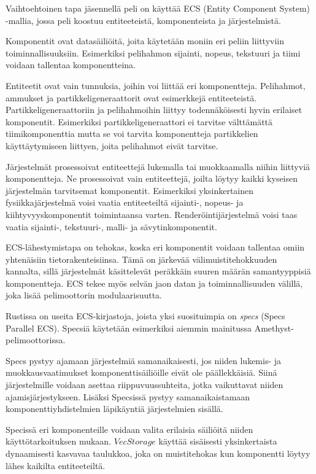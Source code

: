 \documentclass[finnish]{tktltiki2}
\theoremstyle{definition}
\theoremstyle{remark}
\begin{document}
Vaihtoehtoinen tapa jäsennellä peli on käyttää ECS (Entity Component System) -mallia, jossa peli koostuu entiteeteistä, komponenteista ja järjestelmistä.

Komponentit ovat datasäiliöitä, joita käytetään moniin eri peliin liittyviin toiminnallisuuksiin. Esimerkiksi pelihahmon sijainti, nopeus, tekstuuri ja tiimi voidaan tallentaa komponentteina.

Entiteetit ovat vain tunnuksia, joihin voi liittää eri komponentteja. Pelihahmot, ammukset ja partikkeligeneraattorit ovat esimerkkejä entiteeteistä. Partikkeligeneraattoriin ja pelihahmoihin liittyy todennäköisesti hyvin erilaiset komponentit. Esimerkiksi partikkeligeneraattori ei tarvitse välttämättä tiimikomponenttia mutta se voi tarvita komponentteja partikkelien käyttäytymiseen liittyen, joita pelihahmot eivät tarvitse.

Järjestelmät prosessoivat entiteettejä lukemalla tai muokkaamalla niihin liittyviä komponentteja. Ne prosessoivat vain entiteettejä, joilta löytyy kaikki kyseisen järjestelmän tarvitsemat komponentit. Esimerkiksi yksinkertainen fysiikkajärjestelmä voisi vaatia entiteeteiltä sijainti-, nopeus- ja kiihtyvyyskomponentit toimintaansa varten. Renderöintijärjestelmä voisi taas vaatia sijainti-, tekstuuri-, malli- ja sävytinkomponentit.

ECS-lähestymistapa on tehokas, koska eri komponentit voidaan tallentaa omiin yhtenäisiin tietorakenteisiinsa. Tämä on järkevää välimuistitehokkuuden kannalta, sillä järjestelmät käsittelevät peräkkäin suuren määrän samantyyppisiä komponentteja. ECS tekee myös selvän jaon datan ja toiminnallisuuden välillä, joka lisää pelimoottorin modulaarisuutta.

Rustissa on useita ECS-kirjastoja, joista yksi suosituimpia on \textit{specs} (Specs Parallel ECS)\cite{AreWeGameYetEcs}. Specsiä käytetään esimerkiksi aiemmin mainitussa Amethyst-pelimoottorissa. 

Specs pystyy ajamaan järjestelmiä samanaikaisesti, jos niiden lukemis- ja muokkausvaatimukset komponenttisäiliöille eivät ole päällekkäisiä. Siinä järjestelmille voidaan asettaa riippuvuussuhteita, jotka vaikuttavat niiden ajamisjärjestykseen. Lisäksi Specsissä pystyy samanaikaistamaan komponenttiyhdistelmien läpikäyntiä järjestelmien sisällä.

Specissä eri komponenteille voidaan valita erilaisia säiliöitä niiden käyttötarkoituksen mukaan. $VecStorage$ käyttää sisäisesti yksinkertaista dynaamisesti kasvavaa taulukkoa, joka on muistitehokas kun komponentti löytyy lähes kaikilta entiteeteiltä. 
\end{document}

